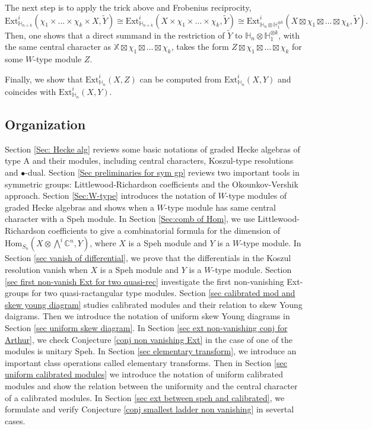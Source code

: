 \documentclass[11pt]{amsart}
\numberwithin{equation}{section}
\theoremstyle{definition}
\begin{document}
The next step is to apply the trick above and Frobenius reciprocity,
\[  \mathrm{Ext}^i_{\mathbb H_{n+k}}(\chi_1\times \ldots \times \chi_k \times X, \widetilde{Y})\cong \mathrm{Ext}^i_{\mathbb H_{n+k}}(X \times \chi_1\times \ldots \times \chi_k, \widetilde{Y}) \cong \mathrm{Ext}^i_{\mathbb H_n\otimes \mathbb H_1^{\otimes k}}(X\boxtimes \chi_1\boxtimes \ldots \boxtimes \chi_k, \widetilde{Y}). 
\]
Then, one shows that a direct summand in the restriction of $\widetilde{Y}$ to \( \mathbb H_n\otimes \mathbb H_1^{\otimes k}\), with the same central character as \(\mathbb X\boxtimes \chi_1\boxtimes \ldots \boxtimes \chi_k\), takes the form \( Z\boxtimes \chi_1\boxtimes \ldots \boxtimes \chi_k \) for some $W$-type module \(Z\).

Finally, we show that \(\mathrm{Ext}^i_{\mathbb H_n}(X, Z)\) can be computed from \(\mathrm{Ext}^i_{\mathbb H_n}(X, Y)\) and coincides with \( \mathrm{Ext}^i_{\mathbb H_n}(X, Y) \). 




\subsection{Organization}
Section \ref{Sec: Hecke alg} reviews some basic notations of graded Hecke algebras of type A and their modules, including central characters, Koszul-type resolutions and  $\bullet$-dual.
Section \ref{Sec preliminaries for sym gp} reviews two important tools in symmetric groups: Littlewood-Richardson coefficients and the Okounkov-Vershik approach. Section \ref{Sec:W-type} introduces the notation of $W$-type modules of graded Hecke algebras and shows when a $W$-type module has same central character with a Speh module. In Section \ref{Sec:comb of Hom}, we use Littlewood-Richardson coefficients to give a combinatorial formula for the dimension of $\mathrm{Hom}_{S_n}(X\otimes\bigwedge^{i}\mathbb{C}^{n}, Y)$, where $X$ is a Speh module and $Y$ is a \(W\)-type module. In Section \ref{sec vanish of differential}, we prove that the differentials in the Koszul resolution vanish when $X$ is a Speh module and $Y$ is a \(W\)-type module. Section \ref{sec first non-vanish Ext for two quasi-rec} investigate the first non-vanishing Ext-groups for two quasi-ractangular type modules. Section \ref{sec calibrated mod and skew young diagram} studies calibrated modules and their relation to skew Young daigrams. Then we introduce the notation of uniform skew Young diagrams in Section \ref{sec uniform skew diagram}. In Section \ref{sec ext non-vanishing conj for Arthur}, we check Conjecture \ref{conj non vanishing Ext} in the case of one of the modules is unitary Speh. In Section 
\ref{sec elementary transform}, we introduce an important class operations called elementary transforms. Then in Section \ref{sec uniform calibrated modules} we introduce the notation of uniform calibrated modules and show the relation between the uniformity and the central character of a calibrated modules. In Section \ref{sec ext between speh and calibrated}, we formulate and verify Conjecture \ref{conj smallest ladder non vanishing} in severtal cases. 
\end{document}
